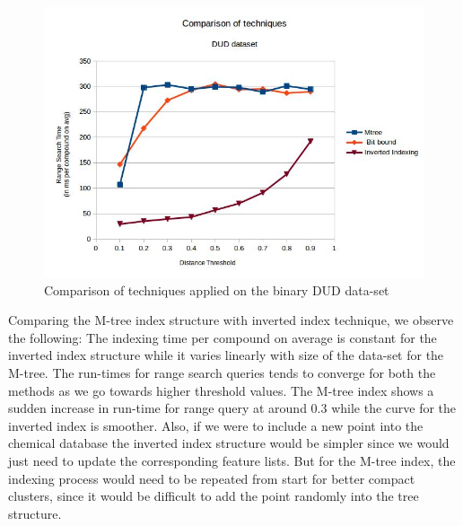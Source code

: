 \begin{figure}[ht!]	
\centering
\includegraphics[width=0.75 \columnwidth]{img/imageC3.jpg}
\caption{Comparison of techniques applied on the binary DUD data-set}
\label{fig:5C3}
\end{figure}

Comparing the M-tree index structure with inverted index technique, we observe the following: The indexing time per compound on average is constant for the inverted index structure while it varies linearly with size of the data-set for the M-tree. The run-times for range search queries tends to converge for both the methods as we go towards higher threshold values. The M-tree index shows a sudden increase in run-time for range query at around 0.3 while the curve for the inverted index is smoother. Also, if we were to include a new point into the chemical database the inverted index structure would be simpler since we would just need to update the corresponding feature lists. But for the M-tree index, the indexing process would need to be repeated from start for better compact clusters, since it would be difficult to add the point randomly into the tree structure.

